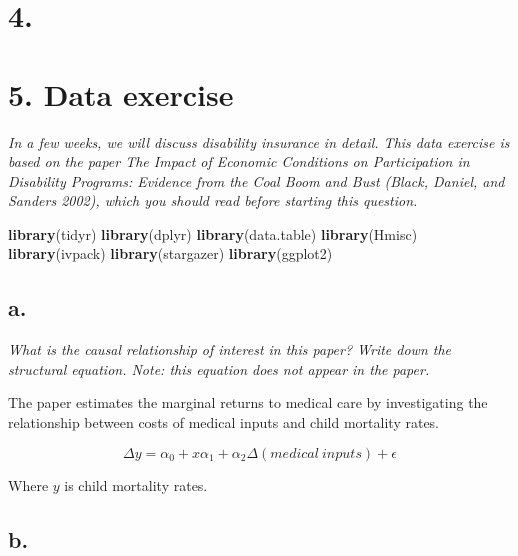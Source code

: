 \documentclass[
]{article}
\newenvironment{Shaded}{\begin{snugshade}}{\end{snugshade}}
\newcommand{\KeywordTok}[1]{\textcolor[rgb]{0.13,0.29,0.53}{\textbf{#1}}}
\newcommand{\NormalTok}[1]{#1}
\begin{document}
\break

\hypertarget{section-2}{%
\section{4.}\label{section-2}}

\break

\hypertarget{data-exercise}{%
\section{5. Data exercise}\label{data-exercise}}

\textit{In a few weeks, we will discuss disability insurance in detail. This data exercise is based on the paper The Impact of Economic Conditions on Participation in Disability Programs: Evidence from the Coal Boom and Bust (Black, Daniel, and Sanders 2002), which you should read before starting this question.}

\begin{Shaded}
\begin{Highlighting}[]
\KeywordTok{library}\NormalTok{(tidyr)}
\KeywordTok{library}\NormalTok{(dplyr)}
\KeywordTok{library}\NormalTok{(data.table)}
\KeywordTok{library}\NormalTok{(Hmisc)}
\KeywordTok{library}\NormalTok{(ivpack)}
\KeywordTok{library}\NormalTok{(stargazer)}
\KeywordTok{library}\NormalTok{(ggplot2)}
\end{Highlighting}
\end{Shaded}

\hypertarget{a.}{%
\subsection{a.}\label{a.}}

\textit{What is the causal relationship of interest in this paper? Write down the structural equation. Note: this equation does not appear in the paper.}

The paper estimates the marginal returns to medical care by
investigating the relationship between costs of medical inputs and child
mortality rates.

\[\Delta y = \alpha_0 + x\alpha_1 + \alpha_{2}\Delta (medical\:inputs) + \epsilon\]

Where \(y\) is child mortality rates.

\hypertarget{b.}{%
\subsection{b.}\label{b.}}
\end{document}
